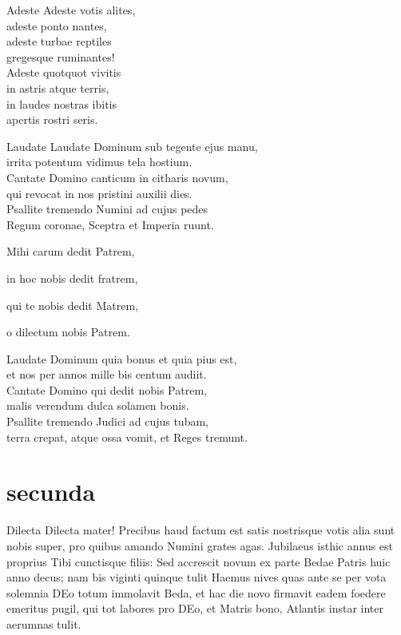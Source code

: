 \documentclass[tocstyle=ref-genre]{ees}
\begin{document}
{\begin{movement}{Adeste}
  Adeste votis alites,\\
  adeste ponto nantes,\\
  adeste turbae reptiles\\
  gregesque ruminantes!\\
  Adeste quotquot vivitis\\
  in astris atque terris,\\
  in laudes nostras ibitis\\
  apertis rostri seris.
\end{movement}

\begin{movement}{Laudate}
  \voice[Coro]
  Laudate Dominum sub tegente ejus manu,\\
  irrita potentum vidimus tela hostium.\\
  Cantate Domino canticum in citharis novum,\\
  qui revocat in nos pristini auxilii dies.\\
  Psallite tremendo Numini ad cujus pedes\\
  Regum coronae, Sceptra et Imperia ruunt.

  Mihi carum dedit Patrem,

  in hoc nobis dedit fratrem,

  qui te nobis dedit Matrem,

  \voice[Soli]
  o dilectum nobis Patrem.

  \voice[Coro]
  Laudate Dominum quia bonus et quia pius est,\\
  et nos per annos mille bis centum audiit.\\
  Cantate Domino qui dedit nobis Patrem,\\
  malis verendum dulca solamen bonis.\\
  Psallite tremendo Judici ad cujus tubam,\\
  terra crepat, atque ossa vomit, et Reges tremunt.
\end{movement}

\part{secunda}

\begin{movement}{Dilecta}
  Dilecta mater! Precibus haud factum est satis
  nostrisque votis alia sunt nobis super,
  pro quibus amando Numini grates agas.
  Jubilaeus isthic annus est
  proprius Tibi cunctisque filiis:
  Sed accrescit novum ex parte
  Bedae Patris huic anno decus;
  nam bis viginti quinque tulit Haemus nives
  quas ante se per vota solemnia
  DEo totum immolavit Beda,
  et hac die novo firmavit
  eadem foedere emeritus pugil,
  qui tot labores pro DEo, et Matris bono,
  Atlantis instar inter aerumnas tulit.


\end{movement}}
\end{document}
